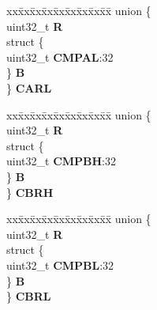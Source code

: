 \begin{DoxyCompactItemize}
\begin{tabbing}
\end{tabbing}\item 
\mbox{\label{structSIU__tag_aaf0bc2d26d81332814b2e941b0167e8b}} 
\begin{tabbing}
xx\=xx\=xx\=xx\=xx\=xx\=xx\=xx\=xx\=\kill
union \{\\
\>uint32\_t {\bfseries R}\\
\>struct \{\\
\>\>uint32\_t {\bfseries CMPAL}:32\\
\>\} {\bfseries B}\\
\} {\bfseries CARL}\\

\end{tabbing}\item 
\mbox{\label{structSIU__tag_a76b442997c38795499e8330c0df6eeb2}} 
\begin{tabbing}
xx\=xx\=xx\=xx\=xx\=xx\=xx\=xx\=xx\=\kill
union \{\\
\>uint32\_t {\bfseries R}\\
\>struct \{\\
\>\>uint32\_t {\bfseries CMPBH}:32\\
\>\} {\bfseries B}\\
\} {\bfseries CBRH}\\

\end{tabbing}\item 
\mbox{\label{structSIU__tag_ac4756ce03c7e12ead7924a7a977f14f1}} 
\begin{tabbing}
xx\=xx\=xx\=xx\=xx\=xx\=xx\=xx\=xx\=\kill
union \{\\
\>uint32\_t {\bfseries R}\\
\>struct \{\\
\>\>uint32\_t {\bfseries CMPBL}:32\\
\>\} {\bfseries B}\\
\} {\bfseries CBRL}\\


\end{tabbing}
\end{DoxyCompactItemize}
